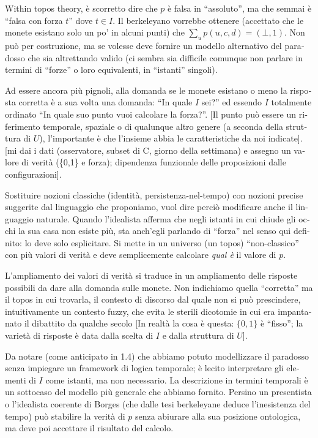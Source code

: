 \begin{italian}
Within topos theory, è scorretto dire che $p$ è falsa in ``assoluto'', ma che semmai è ``falsa con forza $t$'' dove $t \in I$. Il berkeleyano vorrebbe ottenere (accettato che le monete esistano solo un po' in alcuni punti) che $\sum_u p(u,c,d) = (\bot,1)$. Non può per costruzione, ma se volesse deve fornire un modello alternativo del paradosso che sia altrettando valido (ci sembra sia difficile comunque non parlare in termini di ``forze'' o loro equivalenti, in ``istanti'' singoli).

Ad essere ancora più pignoli, alla domanda se le monete esistano o meno la risposta corretta è a sua volta una domanda: ``In quale $I$ sei?'' ed essendo $I$ totalmente ordinato ``In quale suo punto vuoi calcolare la forza?''. [Il punto può essere un riferimento temporale, spaziale o di qualunque altro genere (a seconda della struttura di $U$), l'importante è che l'insieme abbia le caratteristiche da noi indicate]. [mi dai i dati (osservatore, subset di C, giorno della settimana) e assegno un valore di verità (\{0,1\} e forza); dipendenza funzionale delle proposizioni dalle configurazioni].

Sostituire nozioni classiche (identità, persistenza-nel-tempo) con nozioni precise suggerite dal linguaggio che proponiamo, vuol dire perciò modificare anche il linguaggio naturale. Quando l'idealista afferma che negli istanti in cui chiude gli occhi la sua casa non esiste più, sta anch'egli parlando di ``forza'' nel senso qui definito: lo deve solo esplicitare. Si mette in un universo (un topos) ``non-classico'' con più valori di verità e deve semplicemente calcolare \emph{qual è} il valore di $p$.

L'ampliamento dei valori di verità si traduce in un ampliamento delle risposte possibili da dare alla domanda sulle monete. Non indichiamo quella ``corretta'' ma il topos in cui trovarla, il contesto di discorso dal quale non si può prescindere, intuitivamente un contesto fuzzy, che evita le sterili dicotomie in cui era impantanato il dibattito da qualche secolo [In realtà la cosa è questa: $\{0,1\}$ è ``fisso''; la varietà di risposte è data dalla scelta di $I$ e dalla struttura di $U$].

Da notare (come anticipato in 1.4) che abbiamo potuto modellizzare il paradosso senza impiegare un framework di logica temporale; è lecito interpretare gli elementi di $I$ come istanti, ma non necessario. La descrizione in termini temporali è un sottocaso del modello più generale che abbiamo fornito. Persino un presentista o l'idealista coerente di Borges (che dalle tesi berkeleyane deduce l'inesistenza del tempo) può stabilire la verità di $p$ senza abiurare alla sua posizione ontologica, ma deve poi accettare il risultato del calcolo.


\end{italian}
